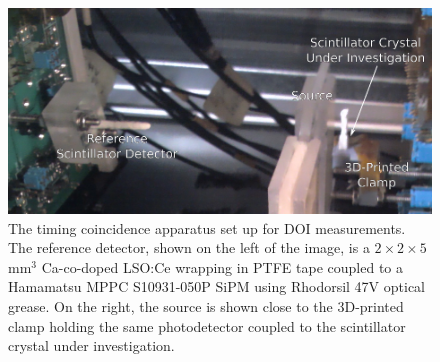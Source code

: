 \begin{figure}[h!]
\begin{center}
\includegraphics[width=0.7\columnwidth]{figures/actualsetup/actualsetup.png}
\caption{\label{fig:actualsetup} The timing coincidence apparatus set up for DOI measurements. The reference detector, shown on the left of the image, is a $2\times2\times5$mm$^3$ Ca-co-doped LSO:Ce wrapping in PTFE tape coupled to a Hamamatsu MPPC S10931-050P SiPM using Rhodorsil 47V optical grease. On the right, the source is shown close to the 3D-printed clamp holding the same photodetector coupled to the scintillator crystal under investigation.}
\end{center}
\end{figure}
